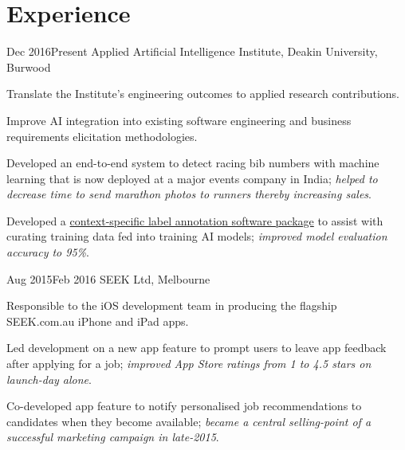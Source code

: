 \vspace{-1.5mm}
\section{Experience}
\vspace{3mm}

\def \asis{A\textsuperscript{2}I\textsuperscript{2}}

{Dec 2016}{Present}
{Applied Artificial Intelligence Institute, Deakin University, Burwood}
{
  \item Translate the Institute's engineering outcomes to applied research contributions.
  \item Improve AI integration into existing software engineering and business requirements elicitation methodologies.
}
{
  \item Developed an end-to-end system to detect racing bib numbers with machine learning that is now deployed at a major events company in India; \textit{helped to decrease time to send marathon photos to runners thereby increasing sales}.
  \item Developed a \href{http://deakin.edu.au/~ca/argus}{context-specific label annotation software package} to assist with curating training data fed into training AI models; \textit{improved model evaluation accuracy to 95\%}.
}

{Aug 2015}{Feb 2016}
{SEEK Ltd, Melbourne}
{
  \item Responsible to the iOS development team in producing the flagship SEEK.com.au iPhone and iPad apps.
}
{
  \item Led development on a new app feature to prompt users to leave app feedback after applying for a job; \textit{improved App Store ratings from 1  to 4.5 stars on launch-day alone}.
  \item Co-developed app feature to notify personalised job recommendations to candidates when they become available; \textit{became a central selling-point of a successful marketing campaign in late-2015}.
}

